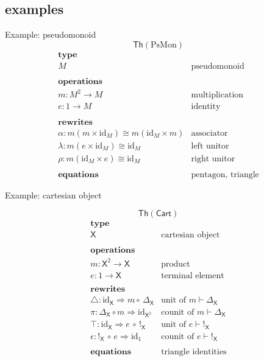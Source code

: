 \documentclass{beamer}
\newcommand{\Th}{\mathsf{Th}}
\newcommand{\X}{\mathsf{X}}
\newcommand{\maps}{\colon}
\newcommand{\id}{\mathrm{id}}
\begin{document}
\subsection{examples}
\begin{frame}{Example: pseudomonoid}
  \[ \Th(\mathrm{PsMon}) \]
  \[\begin{array}{lll}
  \textbf{type}\\ M & \text{pseudomonoid}\\ \\
  \textbf{operations}\\ m\maps M^2 \to M & \text{multiplication}\\
                e\maps1 \to M & \text{identity}\\ \\
  \textbf{rewrites}\\ \alpha \colon m(m \times \id_M) \cong m (\id_M \times m) & \text{associator}\\
                \lambda\maps  m(e \times \id_M) \cong \id_M & \text{left unitor}\\
                \rho\maps m(\id_M \times e) \cong \id_M & \text{right unitor}\\ \\
  \textbf{equations} & \text{pentagon, triangle}
  \end{array}\]
\end{frame}
\begin{frame}{Example: cartesian object}
  
  \[ \Th(\mathsf{Cart}) \]
  \[\begin{array}{lllllll}
      \textbf{type}\\ \X & \text{cartesian object}\\ \\
      \textbf{operations}\\ m \maps \X^2 \to \X & \text{product} \\ 
        e \maps 1 \to \X & \text{terminal element} \\ \\
      \textbf{rewrites}\\
      \bigtriangleup\maps \mathrm{id}_\X \Longrightarrow m \circ\, \Delta_\X & \text{unit of $m \vdash \Delta_\X$}\\
      \pi\maps \Delta_\X \circ m \Longrightarrow \mathrm{id}_{\X^2} & \text{counit of $m \vdash \Delta_\X$}\\
      \top\maps \mathrm{id}_\X \Longrightarrow e \,\circ\, !_\X & \text{unit of $e \vdash !_\X$} \\
      \epsilon \maps !_\X \, \circ \, e \Longrightarrow \mathrm{id}_{1} & \text{counit of $e \vdash !_\X$} \\\\
 \textbf{equations}  & \text{triangle identities}
 \end{array}\]
\end{frame}
\end{document}
